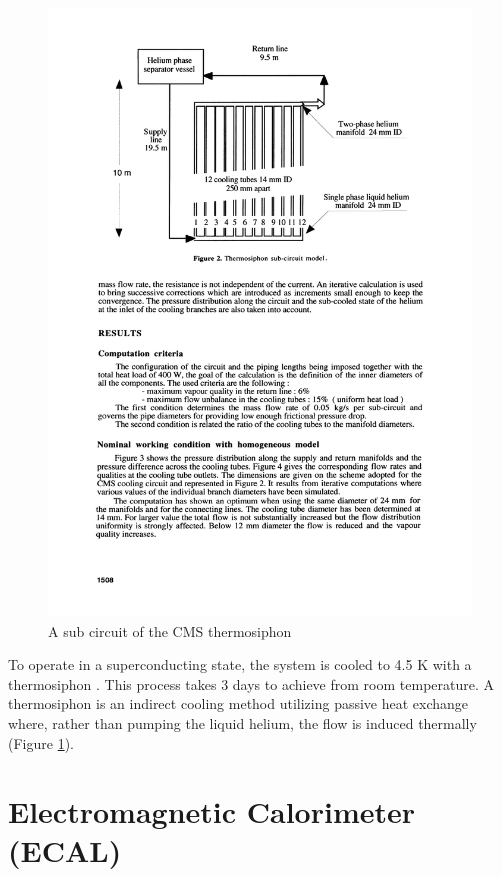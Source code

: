 \begin{figure}
\begin{center}
\includegraphics[width=.85\textwidth]{pics/thermosiphon}
\end{center}
\caption{A sub circuit of the CMS thermosiphon}
\label{fig:siphone}
\end{figure}

To operate in a superconducting state, the system is cooled to 4.5 K with a thermosiphon
\cite{quench}. This process  takes 3 days to achieve from room temperature.
A thermosiphon is an indirect cooling method utilizing passive heat exchange where,
rather than pumping the liquid helium, the flow is induced thermally (Figure \ref{fig:siphone}). 

\section{Electromagnetic Calorimeter (ECAL)}

